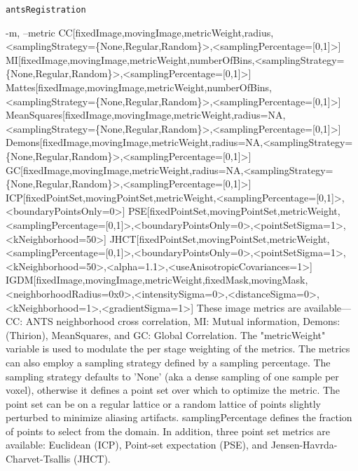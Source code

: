 \documentclass[ignorenonframetext,]{beamer}
\newenvironment{Shaded}{\begin{snugshade}}{\end{snugshade}}
\newcommand{\StringTok}[1]{\textcolor[rgb]{0.31,0.60,0.02}{{#1}}}
\newcommand{\NormalTok}[1]{{#1}}
\begin{document}
\begin{frame}[fragile]{\texttt{antsRegistration}}
\begin{Shaded}
\begin{Highlighting}[]
\StringTok{     -m, --metric CC[fixedImage,movingImage,metricWeight,radius,<samplingStrategy=\{None,Regular,Random\}>,<samplingPercentage=[0,1]>]}
\StringTok{                  MI[fixedImage,movingImage,metricWeight,numberOfBins,<samplingStrategy=\{None,Regular,Random\}>,<samplingPercentage=[0,1]>]}
\StringTok{                  Mattes[fixedImage,movingImage,metricWeight,numberOfBins,<samplingStrategy=\{None,Regular,Random\}>,<samplingPercentage=[0,1]>]}
\StringTok{                  MeanSquares[fixedImage,movingImage,metricWeight,radius=NA,<samplingStrategy=\{None,Regular,Random\}>,<samplingPercentage=[0,1]>]}
\StringTok{                  Demons[fixedImage,movingImage,metricWeight,radius=NA,<samplingStrategy=\{None,Regular,Random\}>,<samplingPercentage=[0,1]>]}
\StringTok{                  GC[fixedImage,movingImage,metricWeight,radius=NA,<samplingStrategy=\{None,Regular,Random\}>,<samplingPercentage=[0,1]>]}
\StringTok{                  ICP[fixedPointSet,movingPointSet,metricWeight,<samplingPercentage=[0,1]>,<boundaryPointsOnly=0>]}
\StringTok{                  PSE[fixedPointSet,movingPointSet,metricWeight,<samplingPercentage=[0,1]>,<boundaryPointsOnly=0>,<pointSetSigma=1>,<kNeighborhood=50>]}
\StringTok{                  JHCT[fixedPointSet,movingPointSet,metricWeight,<samplingPercentage=[0,1]>,<boundaryPointsOnly=0>,<pointSetSigma=1>,<kNeighborhood=50>,<alpha=1.1>,<useAnisotropicCovariances=1>]}
\StringTok{                  IGDM[fixedImage,movingImage,metricWeight,fixedMask,movingMask,<neighborhoodRadius=0x0>,<intensitySigma=0>,<distanceSigma=0>,<kNeighborhood=1>,<gradientSigma=1>]}
\StringTok{          These image metrics are available--- CC: ANTS neighborhood cross correlation,}
\StringTok{          MI: Mutual information, Demons: (Thirion), MeanSquares, and GC: Global}
\StringTok{          Correlation. The "metricWeight" variable is used to modulate the per stage}
\StringTok{          weighting of the metrics. The metrics can also employ a sampling strategy}
\StringTok{          defined by a sampling percentage. The sampling strategy defaults to '}\NormalTok{None}\StringTok{' (aka}
\StringTok{          a dense sampling of one sample per voxel), otherwise it defines a point set over}
\StringTok{          which to optimize the metric. The point set can be on a regular lattice or a}
\StringTok{          random lattice of points slightly perturbed to minimize aliasing artifacts.}
\StringTok{          samplingPercentage defines the fraction of points to select from the domain. In}
\StringTok{          addition, three point set metrics are available: Euclidean (ICP), Point-set}
\StringTok{          expectation (PSE), and Jensen-Havrda-Charvet-Tsallis (JHCT).}


\end{Highlighting}
\end{Shaded}
\end{frame}
\end{document}
